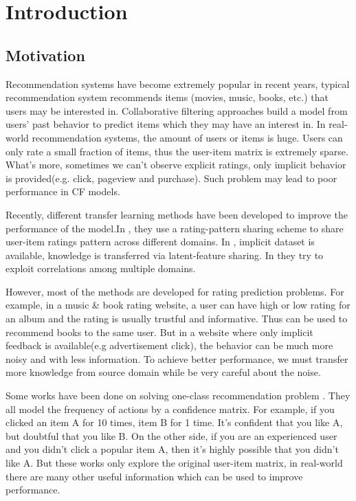 \chapter{Introduction}
\label{chp:intro}

\hspace{0.1in}
\section{Motivation}
Recommendation systems have become extremely popular in recent years, typical recommendation system recommends items (movies, music, books, etc.) that users may be interested in. Collaborative filtering approaches build a model from users' past behavior to predict items which they may have an interest in. 
In real-world recommendation systems, the amount of users or items is huge. Users can only rate a small fraction of items, thus the user-item matrix is extremely sparse. What's more, sometimes we can't observe explicit ratings, only implicit behavior is provided(e.g. click, pageview and purchase). Such problem may lead to poor performance in CF models.

Recently, different transfer learning methods have been developed to improve the performance of the model.In \cite{/ijcai/libin09, /icml/libin09}, they use a rating-pattern sharing scheme to share user-item ratings pattern across different domains. In \cite{/aaai/WPan12, Pan:2011:TLP:2283696.2283784}, implicit dataset is available, knowledge is transferred via latent-feature sharing. In \cite{/uai/ZhangCY10, DBLP:conf/aaai/EldardiryN11} they try to exploit correlations among multiple domains.

However, most of the methods are developed for rating prediction problems. For example, in a music \& book rating website, a user can have high or low rating for an album and the rating is usually trustful and informative. Thus can be used to recommend books to the same user. But in a website where only implicit feedback is available(e.g advertisement click), the behavior can be much more noisy and with less information. To achieve better performance, we must transfer more knowledge from source domain while be very careful about the noise.

Some works have been done on solving one-class recommendation problem \cite{4781121, 4781145, DBLP:dblp_conf/aaai/LinKH14}. They all model the frequency of actions by a confidence matrix. For example, if you clicked an item A for 10 times, item B for 1 time. It's confident that you like A, but doubtful that you like B. On the other side, if you are an experienced user and you didn't click a popular item A, then it's highly possible that you didn't like A. But these works only explore the original user-item matrix, in real-world there are many other useful information which can be used to improve performance.

